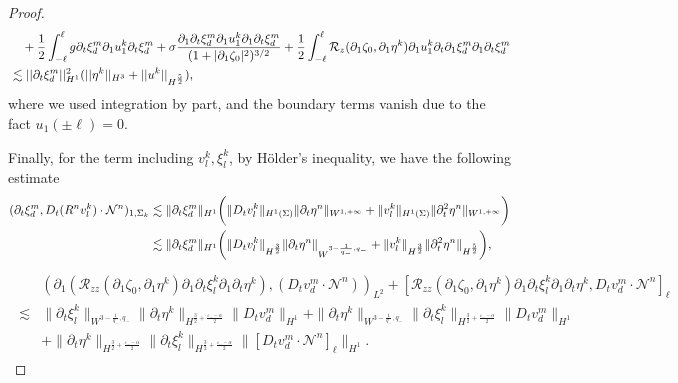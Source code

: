 \documentclass[letterpaper,reqno,10pt,twoside]{amsart}
\theoremstyle{definition}
\theoremstyle{remark}
\def\p{\partial}
\begin{document}
\begin{proof}
\begin{align}
			&\quad+\frac{1}{2}\int_{-\ell}^{\ell}g\partial_{t}\xi_{d}^{m}\partial_{1}u_{1}^{k}\partial_{t}\xi_{d}^{m}+\sigma\frac{\p_1\partial_{t}\xi_{d}^{m}\partial_{1}u_{1}^{k}\partial_{1}\partial_{t}\xi_{d}^{m}}{(1+|\p_1\zeta_0|^2)^{3/2}}+\frac{1}{2}\int_{-\ell}^{\ell}\mathcal{R}_{z}(\partial_{1}\zeta_{0},\partial_{1}\eta^{k})\partial_{1}u_{1}^{k}\partial_{t}\partial_{1}\xi_{d}^{m}\partial_{1}\partial_{t}\xi_{d}^{m}\notag\\
			&\lesssim \vert \vert \partial_{t}\xi_{d}^{m}\vert \vert^{2}_{H^{1}}(\vert \vert \eta^{k}\vert \vert_{H^{3}}+\vert \vert u^{k}\vert\vert_{H^{\frac{5}{2}}})\label{eq:n2},
		\end{align}
		\noindent where we used integration by part, and the boundary terms vanish due to the fact $u_{1}(\pm \ell)=0$. 
		
		Finally, for the term including $v_{l}^{k},\xi_{l}^{k}$, by H\"older's inequality, we have the following estimate
		\begin{align}{\label{eq:n0}}
			\begin{aligned}
				(\p_{t}\xi_{d}^{m},D_{t}(R^{n}v_{l}^{k})\cdot \mathcal{N}^{n})_{1,\Sigma_{k}}
				& \lesssim \|\p_{t}\xi_{d}^{m}\|_{H^{1}}\bigg(\|D_{t}v_{l}^{k}\|_{H^{1}(\Sigma)}\|\p_{t}\eta^{n}\|_{W^{1,+\infty}}+\|v_{l}^{k}\|_{H^{1}(\Sigma)}\|\p_{t}^{2}\eta^{n}\|_{W^{1,+\infty}}\bigg)\\
				&\lesssim \|\p_{t}\xi_{d}^{m}\|_{H^{1}}\bigg(\|D_{t}v_{l}^{k}\|_{H^{\frac{3}{2}}}\|\p_{t}\eta^{n}\|_{W^{3-\frac{1}{q_{-}},q_{-}}}+\|v_{l}^{k}\|_{H^{\frac{3}{2}}}\|\p_{t}^{2}\eta^{n}\|_{H^{\frac{5}{2}}}\bigg),
			\end{aligned}
		\end{align}
		\begin{align}
			\begin{aligned}
				&(\p_{1}(\mathcal{R}_{zz}(\p_{1}\zeta_{0},\p_{1}\eta^{k})\p_{1}\p_{t}\xi_{l}^{k}\p_{1}\p_{t}\eta^{k}),(D_{t}v_{d}^{m}\cdot \mathcal{N}^{n}))_{L^{2}}+[\mathcal{R}_{zz}(\p_{1}\zeta_{0},\p_{1}\eta^{k})\p_{1}\p_{t}\xi_{l}^{k}\p_{1}\p_{t}\eta^{k},D_{t}v_{d}^{m}\cdot \mathcal{N}^{n}]_{\ell}\\
				\lesssim& \|\p_{t}\xi_{l}^{k}\|_{W^{3-\frac{1}{q_{-}},q_{-}}}\|\p_{t}\eta^{k}\|_{H^{\frac{3}{2}+\frac{\varepsilon_{-}-\alpha}{2}}}\|D_{t}v_{d}^{m}\|_{H^{1}}+\|\p_{t}\eta^{k}\|_{W^{3-\frac{1}{q_{-}},q_{-}}}\|\p_{t}\xi_{l}^{k}\|_{H^{\frac{3}{2}+\frac{\varepsilon_{-}-\alpha}{2}}}\|D_{t}v_{d}^{m}\|_{H^{1}}\\
				&+\|\p_{t}\eta^{k}\|_{H^{\frac{3}{2}+\frac{\varepsilon_{-}-\alpha}{2}}}\|\p_{t}\xi_{l}^{k}\|_{H^{\frac{3}{2}+\frac{\varepsilon_{-}-\alpha}{2}}}\|[D_{t}v_{d}^{m}\cdot\mathcal{N}^{n}]_{\ell}\|_{H^{1}}.
			\end{aligned}
		\end{align}
		

\end{proof}
\end{document}
